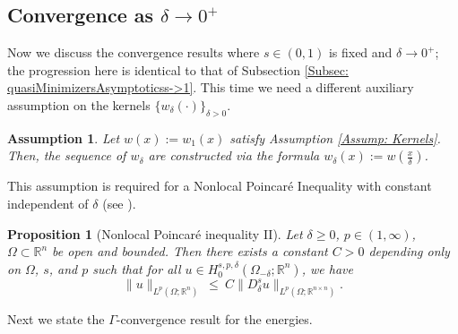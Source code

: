 \documentclass[11pt, reqno]{amsart}   	%
\theoremstyle{plain}
\numberwithin{equation}{section}
\newtheorem{assumption}[thm]{Assumption}
\newtheorem{proposition}[thm]{Proposition}
\def\de{\delta}
\def\Ga{\Gamma}
\def\Om{\Omega}
\def\R{\mathbb{R}}
\begin{document}

 \subsection{Convergence as $\de \rightarrow 0^+$}\label{Subsec: QuasiMinsConvDe->0}

 Now we discuss the convergence results where $s \in (0, 1)$ is fixed and $\de \rightarrow 0^+$; the progression here is identical to that of Subsection \ref{Subsec: quasiMinimizersAsymptoticss->1}. This time we need a different auxiliary assumption on the kernels $\{w_{\de}(\cdot)\}_{\de > 0}$.

\begin{assumption}\label{Assump: kernelde->0}
    Let $w(x):=w_1(x)$ satisfy Assumption \ref{Assump: Kernels}. Then, the sequence of $w_\de$ are constructed via the formula $w_\de(x):=w\left(\frac{x}{\de}\right)$. 
\end{assumption}

This assumption is required for a Nonlocal Poincaré Inequality with constant independent of $\de$ (see \cite[Corollary 3.4]{cueto2025gamma}). 

    \begin{proposition}[Nonlocal Poincaré inequality II]\label{Prop: NLPoincarede}
		Let $\de \geq 0$, $p \in (1, \infty)$, $\Om \subset \R^n$ be open and bounded. Then there exists a constant $C > 0$ depending only on $\Om$, $s$, and $p$ such that for all $u \in H^{s, p, \de}_0(\Om_{-\de}; \R^n)$, we have
		\begin{equation}\label{Eq: NLPoincarede}
			\|u\|_{L^p(\Om; \R^n)} \ \leq \ C\|D^s_{\de}u\|_{L^p(\Om; \R^{n\times n})}.
		\end{equation}
	\end{proposition}
    
Next we state the $\Ga$-convergence result for the energies.
\end{document}

